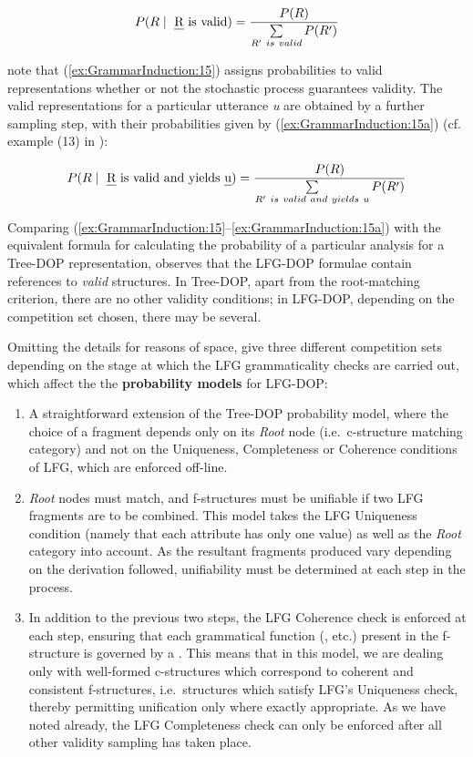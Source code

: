 \documentclass[output=paper,hidelinks]{langscibook}
\begin{document}
\begin{equation}
\label{ex:GrammarInduction:15}
P(R \mid\text{ {\em R} is valid}) = \frac{P(R)}{\sum\limits_{R'~is~valid} P(R')}
\end{equation}

\citet{bod-kaplan-1998-probabilistic-corpus} note that (\ref{ex:GrammarInduction:15}) assigns
probabilities to valid representations whether or not the stochastic
process guarantees validity. The valid representations for a
particular utterance {\em u} are obtained by a further sampling step,
with their probabilities given by (\ref{ex:GrammarInduction:15a}) (cf. example (13) in \citealt[148]{bod-kaplan-1998-probabilistic-corpus}): 

\begin{equation}
\label{ex:GrammarInduction:15a}
P(R \mid\text{ {\em R} is valid and yields {\em u}}) = \frac{P(R)}{\sum\limits_{R'~is~valid~and~yields~u} P(R')}
\end{equation}

Comparing (\ref{ex:GrammarInduction:15}--\ref{ex:GrammarInduction:15a}) with the equivalent formula for calculating the probability of a particular analysis for a Tree-DOP representation, \citet{Way01} observes that the LFG-DOP formulae contain references to {\em valid} structures. In Tree-DOP, apart from
the root-matching criterion, there are no other validity conditions; in LFG-DOP, depending on the competition set chosen, there may be several.

Omitting the details for reasons of space, \citet{bod-kaplan-1998-probabilistic-corpus} give three different competition sets depending on the stage at which the LFG grammaticality checks are carried out, which affect the the {\normalfont \bfseries  probability models} for LFG-DOP:

\begin{enumerate}
\item A straightforward extension of the Tree-DOP probability model, where the choice of a fragment depends only on its {\em Root} node (i.e.\ c-structure  matching category) and not on the Uniqueness, Completeness or Coherence
conditions of LFG, which are enforced off-line.
\item {\em Root} nodes must match, and f-structures must be unifiable if two LFG fragments are to be combined. This model takes the LFG Uniqueness condition (namely that each attribute has only one value) as 
well as the {\em Root} category into account. As the resultant fragments produced vary depending on the derivation followed, unifiability must be determined at each step in the process.
\item In addition to the previous two steps, the LFG Coherence check is enforced at each step, ensuring that each grammatical function (\SUBJ, \OBJ etc.) present in the f-structure is governed  by a \PRED. This means that in this model, we are dealing only with well-formed c-structures which correspond to coherent and consistent
f-structures, i.e.\ structures which satisfy LFG's Uniqueness check, thereby permitting unification only 
where exactly appropriate. As we have noted already, the LFG Completeness check can only be enforced after
all other validity sampling has taken place.
\end{enumerate}
\end{document}
